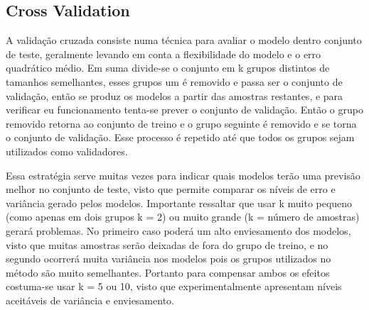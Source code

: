 \subsection{Cross Validation}

A validação cruzada consiste numa técnica para avaliar o modelo dentro conjunto de teste, geralmente levando em conta a flexibilidade do modelo e o erro quadrático médio. Em suma divide-se o conjunto em k grupos distintos de tamanhos semelhantes, esses grupos um é removido e passa ser o conjunto de validação, então se produz os modelos a partir das amostras restantes, e para verificar  eu funcionamento tenta-se prever o conjunto de validação. Então o grupo removido retorna ao conjunto de treino e o grupo seguinte é removido e se torna o conjunto de validação. Esse processo é repetido até que todos os grupos sejam utilizados como validadores.

Essa estratégia serve muitas vezes para indicar quais modelos terão uma previsão melhor no conjunto de teste, visto que permite comparar os níveis de erro e variância gerado pelos modelos. Importante ressaltar que usar k muito pequeno (como apenas em dois grupos k = 2) ou muito grande (k = número de amostras) gerará problemas. No primeiro caso poderá um alto enviesamento dos modelos, visto que muitas amostras serão deixadas de fora do grupo de treino, e no segundo ocorrerá muita variância nos modelos pois os grupos utilizados no método são muito semelhantes. Portanto para compensar ambos os efeitos costuma-se usar k = 5 ou 10, visto que experimentalmente apresentam níveis aceitáveis de variância e enviesamento.





